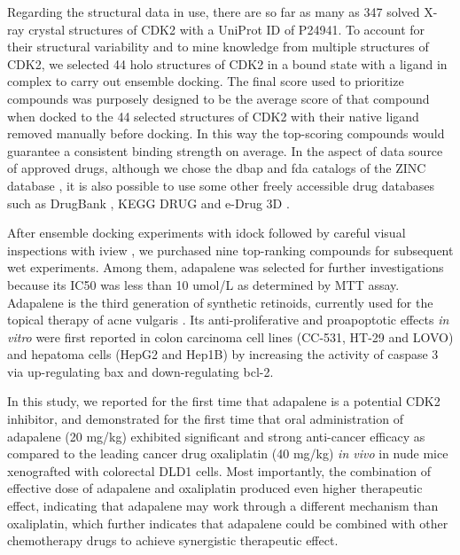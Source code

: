 \documentclass[10pt]{article}
\begin{document}
Regarding the structural data in use, there are so far as many as 347 solved X-ray crystal structures of CDK2 with a UniProt ID of P24941. To account for their structural variability and to mine knowledge from multiple structures of CDK2, we selected 44 holo structures of CDK2 in a bound state with a ligand in complex to carry out ensemble docking. The final score used to prioritize compounds was purposely designed to be the average score of that compound when docked to the 44 selected structures of CDK2 with their native ligand removed manually before docking. In this way the top-scoring compounds would guarantee a consistent binding strength on average. In the aspect of data source of approved drugs, although we chose the dbap and fda catalogs of the ZINC database \citep{532,1178}, it is also possible to use some other freely accessible drug databases such as DrugBank \citep{1594}, KEGG DRUG \citep{1595} and e-Drug 3D \citep{1125}.

After ensemble docking experiments with idock \citep{1153,1362} followed by careful visual inspections with iview \citep{1366}, we purchased nine top-ranking compounds for subsequent wet experiments. Among them, adapalene was selected for further investigations because its IC50 was less than 10 umol/L as determined by MTT assay. Adapalene is the third generation of synthetic retinoids, currently used for the topical therapy of acne vulgaris \citep{1599}. Its anti-proliferative and proapoptotic effects \textit{in vitro} were first reported in colon carcinoma cell lines (CC-531, HT-29 and LOVO) \citep{1600} and hepatoma cells (HepG2 and Hep1B) \citep{1601} by increasing the activity of caspase 3 via up-regulating bax and down-regulating bcl-2.

In this study, we reported for the first time that adapalene is a potential CDK2 inhibitor, and demonstrated for the first time that oral administration of adapalene (20 mg/kg) exhibited significant and strong anti-cancer efficacy as compared to the leading cancer drug oxaliplatin (40 mg/kg) \textit{in vivo} in nude mice xenografted with colorectal DLD1 cells. Most importantly, the combination of effective dose of adapalene and oxaliplatin produced even higher therapeutic effect, indicating that adapalene may work through a different mechanism than oxaliplatin, which further indicates that adapalene could be combined with other chemotherapy drugs to achieve synergistic therapeutic effect.
\end{document}
